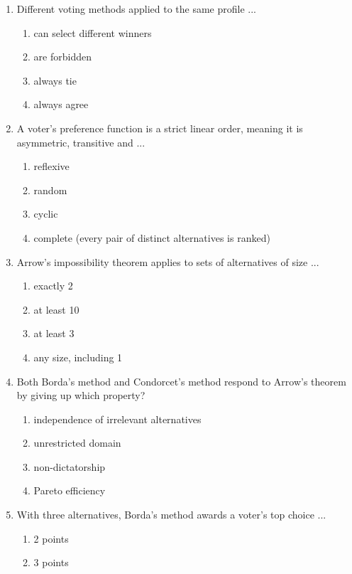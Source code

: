 \documentclass[11pt]{article}
\begin{document}
\begin{enumerate}[itemsep=6pt]
\begin{enumerate}
    \item it ignores first choice votes
    \item pairwise majorities may cycle, so no candidate beats all others
  \end{enumerate}
  \item Different voting methods applied to the same profile ...
  \begin{enumerate}
    \item can select different winners
    \item are forbidden
    \item always tie
    \item always agree
  \end{enumerate}
  \item A voter's preference function is a strict linear order, meaning it is asymmetric, transitive and ...
  \begin{enumerate}
    \item reflexive
    \item random
    \item cyclic
    \item complete (every pair of distinct alternatives is ranked)
  \end{enumerate}
  \item Arrow's impossibility theorem applies to sets of alternatives of size ...
  \begin{enumerate}
    \item exactly 2
    \item at least 10
    \item at least 3
    \item any size, including 1
  \end{enumerate}
  \item Both Borda's method and Condorcet's method respond to Arrow's theorem by giving up which property?
  \begin{enumerate}
    \item independence of irrelevant alternatives
    \item unrestricted domain
    \item non-dictatorship
    \item Pareto efficiency
  \end{enumerate}
  \item With three alternatives, Borda's method awards a voter's top choice ...
  \begin{enumerate}
    \item 2 points
    \item 3 points

\end{enumerate}
\end{enumerate}
\end{document}
